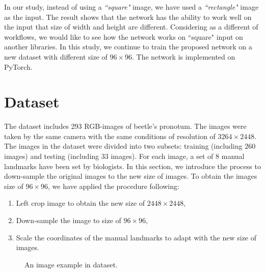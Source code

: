 \documentclass[12pt,a4paper]{article}
\begin{document}
In our study, instead of using a \textit{``square"} image, we have used a \textit{``rectangle"} image as the input. The result shows that the network has the ability to work well on the input that size of width and height are different. Considering as a different of workflows, we would like to see how the network works on ``square" input on another libraries. In this study, we continue to train the proposed network on a new dataset with different size of $96 \times 96$. The network is implemented on PyTorch.

\section{Dataset}
The dataset includes 293 RGB-images of beetle's pronotum. The images were taken by the same camera with the same conditions of resolution of $3264 \times 2448$. The images in the dataset were divided into two subsets: training (including $260$ images) and testing (including $33$ images). For each image, a set of 8 manual landmarks have been set by biologists.
In this section, we introduce the process to down-sample the original images to the new size of images. To obtain the images size of $96 \times 96$, we have applied the procedure following:
\begin{enumerate}[nosep]
	\item Left crop image to obtain the new size of $2448 \times 2448$,
	\item Down-sample the image to size of $96 \times 96$,
	\item Scale the coordinates of the manual landmarks to adapt with the new size of images.
\end{enumerate}

\begin{figure}[h!]
\centering
{}
\caption{An image example in dataset.}
\end{figure}
\end{document}
